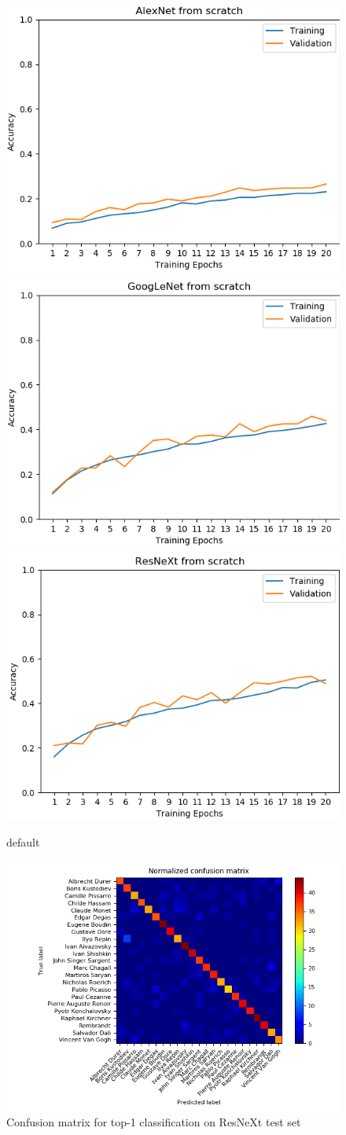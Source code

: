 \documentclass{article}
\begin{document}
\begin{figure}[htp]
	
	\centering
	\includegraphics[width=.33\textwidth]{graphs/alex_scratch}\hfill
	\includegraphics[width=.33\textwidth]{graphs/google_scratch}\hfill
	\includegraphics[width=.33\textwidth]{graphs/res_scratch}
	
	\caption{default}
	\label{fig:figure4}
	
\end{figure}
\begin{figure}
	\centering
	\includegraphics[width=0.8\linewidth]{graphs/confusion}
	\caption{Confusion matrix for top-1 classification on ResNeXt test set}
	\label{fig:confusion}
\end{figure}
\end{document}
